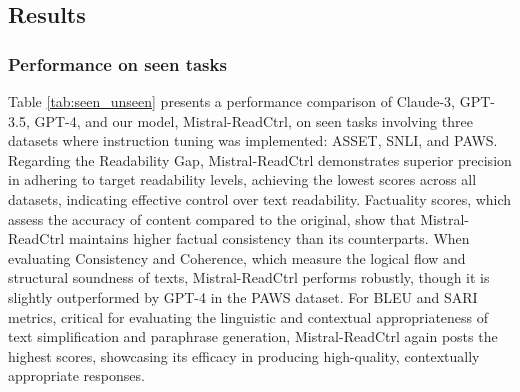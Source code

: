 \documentclass[11pt]{article}
\begin{document}

    
    



\subsection{Results}

\subsubsection{Performance on seen tasks}
Table \ref{tab:seen_unseen} presents a performance comparison of Claude-3, GPT-3.5, GPT-4, and our model, Mistral-ReadCtrl, on seen tasks involving three datasets where instruction tuning was implemented: ASSET, SNLI, and PAWS. Regarding the Readability Gap, Mistral-ReadCtrl demonstrates superior precision in adhering to target readability levels, achieving the lowest scores across all datasets, indicating effective control over text readability. Factuality scores, which assess the accuracy of content compared to the original, show that Mistral-ReadCtrl maintains higher factual consistency than its counterparts. When evaluating Consistency and Coherence, which measure the logical flow and structural soundness of texts, Mistral-ReadCtrl performs robustly, though it is slightly outperformed by GPT-4 in the PAWS dataset. For BLEU and SARI metrics, critical for evaluating the linguistic and contextual appropriateness of text simplification and paraphrase generation, Mistral-ReadCtrl again posts the highest scores, showcasing its efficacy in producing high-quality, contextually appropriate responses. 
\end{document}
